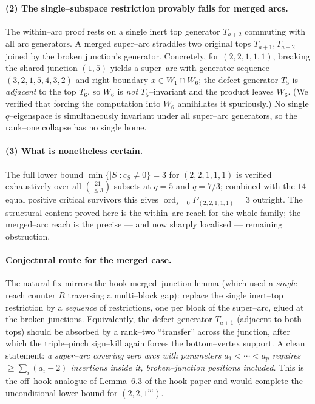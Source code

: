 \documentclass[11pt]{article}
\theoremstyle{definition}
\DeclareMathOperator{\ord}{ord}
\newcommand{\W}{W}
\begin{document}
\paragraph{(2) The single--subspace restriction provably fails for merged arcs.}
The within--arc proof rests on a single inert top generator $T_{a+2}$ commuting with all
arc generators. A merged super--arc straddles two original tops $T_{a+1},T_{a+2}$ joined
by the broken junction's generator. Concretely, for $(2,2,1,1,1)$, breaking the shared
junction $(1,5)$ yields a super--arc with generator sequence $(3,2,1,5,4,3,2)$ and right
boundary $x\in\W_1\cap\W_6$; the defect generator $T_5$ is \emph{adjacent} to the top
$T_6$, so $\W_6$ is \emph{not} $T_5$--invariant and the product leaves $\W_6$. (We verified
that forcing the computation into $\W_6$ annihilates it spuriously.) No single
$q$--eigenspace is simultaneously invariant under all super--arc generators, so the
rank--one collapse has no single home.

\paragraph{(3) What is nonetheless certain.}
The full lower bound $\min\{|S|:c_S\ne0\}=3$ for $(2,2,1,1,1)$ is verified exhaustively over
all $\binom{21}{\le3}$ subsets at $q=5$ and $q=7/3$; combined with the $14$ equal positive
critical survivors this gives $\ord_{s=0}P_{(2,2,1,1,1)}=3$ outright. The structural
content proved here is the within--arc reach for the whole family; the merged--arc reach is
the precise --- and now sharply localised --- remaining obstruction.

\paragraph{Conjectural route for the merged case.}
The natural fix mirrors the hook merged--junction lemma (which used a \emph{single} reach
counter $R$ traversing a multi--block gap): replace the single inert--top restriction by a
\emph{sequence} of restrictions, one per block of the super--arc, glued at the broken
junctions. Equivalently, the defect generator $T_{a+1}$ (adjacent to both tops) should be
absorbed by a rank--two ``transfer'' across the junction, after which the triple--pinch
sign--kill again forces the bottom--vertex support. A clean statement: \emph{a super--arc
covering zero arcs with parameters $a_1<\cdots<a_p$ requires $\ge\sum_i(a_i-2)$ insertions
inside it, broken--junction positions included.} This is the off--hook analogue of
Lemma~6.3 of the hook paper and would complete the unconditional lower bound for
$(2,2,1^m)$.
\end{document}
